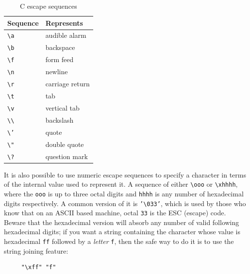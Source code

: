     \begin{table}[htb]
      \centering
      \begin{tabular}{ll}
        \toprule
        Sequence               & Represents     \\
        \midrule
        \texttt{\textbackslash a} & audible alarm    \\
        \texttt{\textbackslash b} & backspace       \\
        \texttt{\textbackslash f} & form feed       \\
        \texttt{\textbackslash n} & newline         \\
        \texttt{\textbackslash r} & carriage return \\
        \texttt{\textbackslash t} & tab             \\
        \texttt{\textbackslash v} & vertical tab    \\
        \texttt{\textbackslash\textbackslash} & backslash    \\
        \texttt{\textbackslash'} & quote            \\
        \texttt{\textbackslash"} & double quote     \\
        \texttt{\textbackslash?} & question mark    \\
        \bottomrule
      \end{tabular}
      \caption{\label{tab:escSeq}C escape sequences}
    \end{table}


   It is also possible to use numeric escape sequences to specify a
    character in terms of the internal value used to represent it. A sequence
    of either \texttt{\textbackslash ooo} or \texttt{\textbackslash xhhhh},
    where the \texttt{ooo} is up to three octal digits
    and \texttt{hhhh} is any number of hexadecimal digits
    respectively. A common version of it is \texttt{'\textbackslash 033'},
    which is used by those who know that on an ASCII based machine,
    octal \texttt{33} is the ESC (escape) code. Beware that the
    hexadecimal version will absorb any number of valid following hexadecimal
    digits; if you want a string containing the character whose value is
    hexadecimal \texttt{ff} followed by a
    \textit{letter} \texttt{f}, then the safe way to do it is to use
    the string joining feature:


   \begin{Verbatim}
     "\xff" "f"
   \end{Verbatim}

